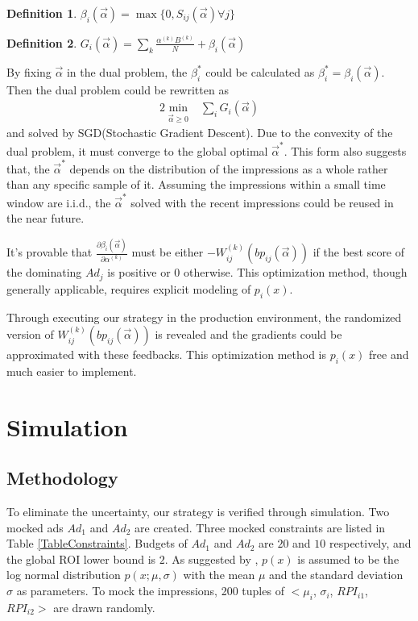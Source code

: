 \documentclass{article}
\newtheorem{definition}{Definition}[section]
\newcommand{\sbp}{bp_{ij}}
\newcommand{\sW}{W_{ij}^{(k)}}
\newcommand{\sB}{B^{(k)}}
\newcommand{\salpha}{\alpha^{(k)}}
\newcommand{\sbeta}{\beta_i}
\newcommand{\sS}{S_{ij}}
\newcommand{\sG}{G_i}
\newcommand{\valpha}{\vec{\alpha}}
\begin{document}
\begin{definition}
$\sbeta(\valpha) = \max \{ 0, \sS(\valpha) \forall j \}$
\end{definition}

\begin{definition}
$\sG(\valpha) = \sum\limits_k \frac{\salpha \sB}{N} + \sbeta(\valpha)$
\end{definition}

By fixing $\valpha$ in the dual problem, the $\sbeta^*$ could be calculated as $\sbeta^* = \sbeta(\valpha)$.
Then the dual problem could be rewritten as
\begin{alignat}{2}
\min\limits_{\valpha \ge 0} & \sum\limits_i \sG(\valpha)
\end{alignat}
    and solved by SGD(Stochastic Gradient Descent).
Due to the convexity of the dual problem, it must converge to the global optimal $\valpha^*$.
This form also suggests that, the $\valpha^*$ depends on the distribution of the impressions as a whole
    rather than any specific sample of it.
Assuming the impressions within a small time window are i.i.d.,
    the $\valpha^*$ solved with the recent impressions could be reused in the near future.

It's provable that $\frac{\partial\sbeta(\valpha)}{\partial\salpha}$ must be
    either $-\sW(\sbp(\valpha))$ if the best score of the dominating $Ad_j$ is positive or $0$ otherwise.
This optimization method, though generally applicable, requires explicit modeling of $p_i(x)$.

Through executing our strategy in the production environment, the randomized version of $\sW(\sbp(\valpha))$ is revealed
    and the gradients could be approximated with these feedbacks.
This optimization method is $p_i(x)$ free and much easier to implement.

\section{Simulation} \label{Simulation}

\subsection{Methodology}

To eliminate the uncertainty, our strategy is verified through simulation.
Two mocked ads $Ad_1$ and $Ad_2$ are created.
Three mocked constraints are listed in Table \ref{TableConstraints}.
Budgets of $Ad_1$ and $Ad_2$ are $20$ and $10$ respectively, and the global ROI lower bound is $2$.
As suggested by \cite{YingCui2011}, $p(x)$ is assumed to be the log normal distribution $p(x;\mu,\sigma)$
    with the mean $\mu$ and the standard deviation $\sigma$ as parameters.
To mock the impressions, 200 tuples of $<\mu_i$, $\sigma_i$, $RPI_{i1}$, $RPI_{i2}>$ are drawn randomly.
\end{document}
